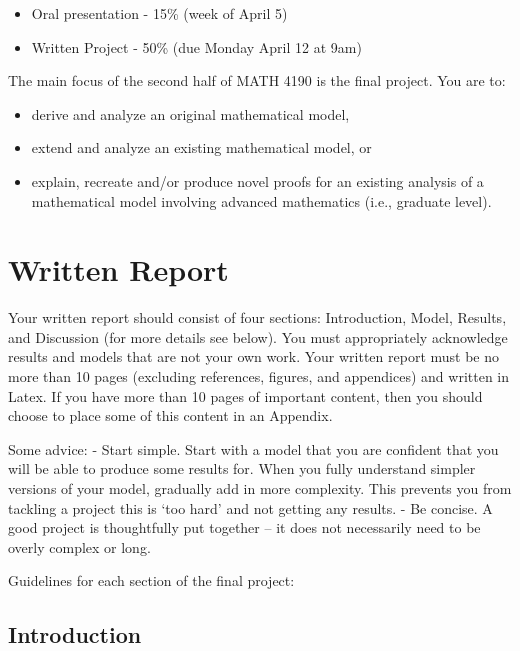 \documentclass[]{book}
\providecommand{\tightlist}{%
  \setlength{\itemsep}{0pt}\setlength{\parskip}{0pt}}
\begin{document}
\begin{itemize}
\tightlist
\item
  Oral presentation - 15\% (week of April 5)
\item
  Written Project - 50\% (due Monday April 12 at 9am)
\end{itemize}

The main focus of the second half of MATH 4190 is the final project. You
are to:

\begin{itemize}
\tightlist
\item
  derive and analyze an original mathematical model,
\item
  extend and analyze an existing mathematical model, or
\item
  explain, recreate and/or produce novel proofs for an existing analysis
  of a mathematical model involving advanced mathematics (i.e., graduate
  level).
\end{itemize}

\section{Written Report}\label{written-report}

Your written report should consist of four sections: Introduction,
Model, Results, and Discussion (for more details see below). You must
appropriately acknowledge results and models that are not your own work.
Your written report must be no more than 10 pages (excluding references,
figures, and appendices) and written in Latex. If you have more than 10
pages of important content, then you should choose to place some of this
content in an Appendix.

Some advice: - Start simple. Start with a model that you are confident
that you will be able to produce some results for. When you fully
understand simpler versions of your model, gradually add in more
complexity. This prevents you from tackling a project this is `too hard'
and not getting any results. - Be concise. A good project is
thoughtfully put together -- it does not necessarily need to be overly
complex or long.

Guidelines for each section of the final project:

\subsection{Introduction}\label{introduction}
\end{document}
